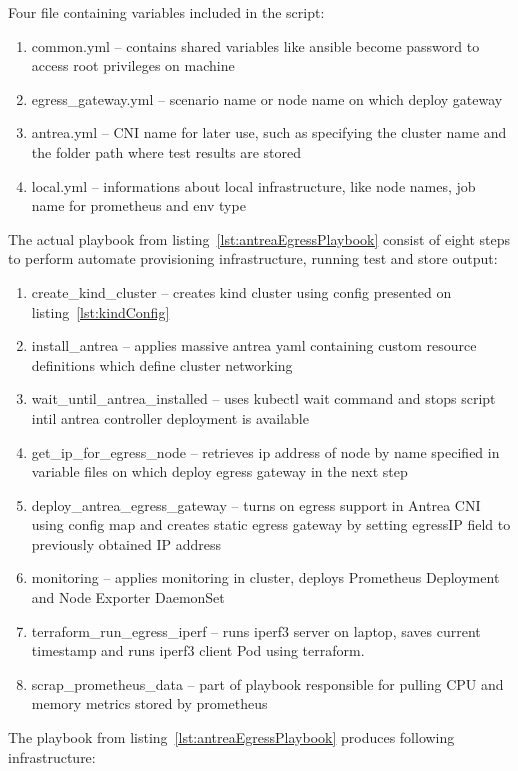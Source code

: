 Four file containing variables included in the script:
\begin{enumerate}
  \item common.yml -- contains shared variables like ansible become password to access root privileges on machine
  \item egress\_gateway.yml -- scenario name or node name on which deploy gateway
  \item antrea.yml -- CNI name for later use, such as specifying the cluster name and the folder path where test results are stored
  \item local.yml -- informations about local infrastructure, like node names, job name for prometheus and env type
\end{enumerate}

The actual playbook from listing~\ref{lst:antreaEgressPlaybook} consist of eight steps to perform automate provisioning infrastructure, running test and store output:
\begin{enumerate}
  \item create\_kind\_cluster -- creates kind cluster using config presented on listing~\ref{lst:kindConfig}
  \item install\_antrea -- applies massive antrea yaml containing custom resource definitions which define cluster networking 
  \item wait\_until\_antrea\_installed -- uses kubectl wait command and stops script intil antrea controller deployment is available
  \item get\_ip\_for\_egress\_node -- retrieves ip address of node by name specified in variable files on which deploy egress gateway in the next step 
  \item deploy\_antrea\_egress\_gateway -- turns on egress support in Antrea CNI using config map and creates static egress gateway by setting egressIP field to previously obtained IP address 
  \item monitoring -- applies monitoring in cluster, deploys Prometheus Deployment and Node Exporter DaemonSet
  \item terraform\_run\_egress\_iperf -- runs iperf3 server on laptop, saves current timestamp and runs iperf3 client Pod using terraform.
  \item scrap\_prometheus\_data -- part of playbook responsible for pulling CPU and memory metrics stored by prometheus
\end{enumerate}

The playbook from listing~\ref{lst:antreaEgressPlaybook} produces following infrastructure:

